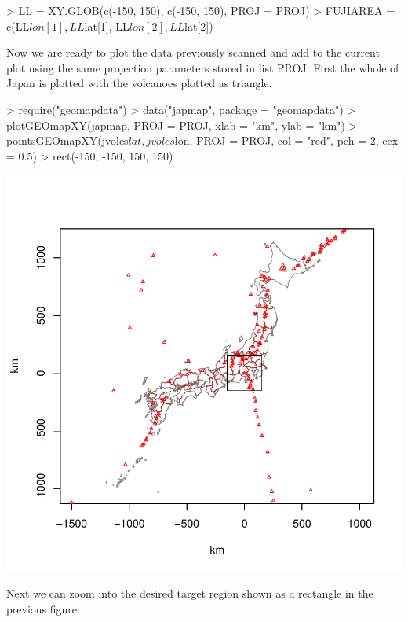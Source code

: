 \documentclass{article}
\begin{document}
\begin{Schunk}
\begin{Sinput}
> LL = XY.GLOB(c(-150, 150), c(-150, 150), PROJ = PROJ)
> FUJIAREA = c(LL$lon[1], LL$lat[1], LL$lon[2], LL$lat[2])
\end{Sinput}
\end{Schunk}

Now we are ready to plot the data previously
scanned and add to the current plot using the same
projection parameters stored in list PROJ.
First the whole of Japan is plotted 
with the volcanoes plotted as triangle.

\begin{Schunk}
\begin{Sinput}
> require("geomapdata")
> data("japmap", package = "geomapdata")
> plotGEOmapXY(japmap, PROJ = PROJ, xlab = "km", ylab = "km")
> pointsGEOmapXY(jvolcs$lat, jvolcs$lon, PROJ = PROJ, col = "red", 
     pch = 2, cex = 0.5)
> rect(-150, -150, 150, 150)
\end{Sinput}
\end{Schunk}
\includegraphics{gmap-011}

Next we can zoom into the desired target region shown as a rectangle 
in the previous figure:
\end{document}
